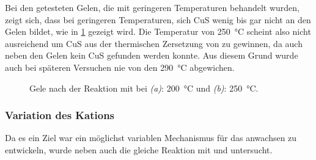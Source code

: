 		Bei den getesteten Gelen, die mit geringeren Temperaturen behandelt wurden, zeigt sich, dass bei geringeren Temperaturen, sich CuS wenig bis gar nicht an den Gelen bildet, wie in \cref{fig:Gel-E-Temp} gezeigt wird.
		Die Temperatur von \SI{250}{\degreeCelsius} scheint also nicht ausreichend um CuS aus der thermischen Zersetzung von  zu gewinnen, da auch neben den Gelen kein CuS gefunden werden konnte.
		Aus diesem Grund wurde auch bei späteren Versuchen nie von den \SI{290}{\degreeCelsius} abgewichen.
		\begin{figure}[H]
			\centering
			\caption{Gele nach der Reaktion mit  bei \emph{(a)}: \SI{200}{\degreeCelsius} und \emph{(b)}: \SI{250}{\degreeCelsius}.}
			\label{fig:Gel-E-Temp}
		\end{figure}
	
	\subsubsection{Variation des Kations}
	
		Da es ein Ziel war ein möglichst variablen Mechanismus für das anwachsen zu entwickeln, wurde neben  auch die gleiche Reaktion mit  und  untersucht.
		

